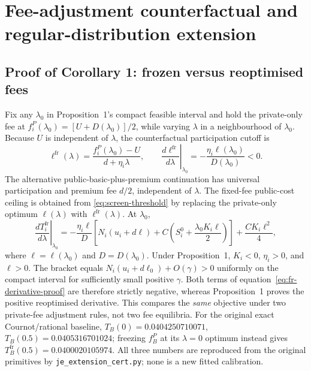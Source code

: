 \clearpage
\section{Fee-adjustment counterfactual and regular-distribution extension}
\label{app:extension}

\subsection{Proof of Corollary 1: frozen versus reoptimised fees}
Fix any $\lambda_0$ in Proposition~1's compact feasible interval and
hold the private-only fee at
$f_i^P(\lambda_0)=[U+D(\lambda_0)]/2$, while varying
$\lambda$ in a neighbourhood of $\lambda_0$. Because $U$ is independent
of $\lambda$, the counterfactual participation cutoff is
\[
 \ell^{\mathrm{fr}}(\lambda)
 =\frac{f_i^P(\lambda_0)-U}{d+\eta_i\lambda},\qquad
 \left.\frac{d\ell^{\mathrm{fr}}}{d\lambda}\right|_{\lambda_0}
 =-\frac{\eta_i\ell(\lambda_0)}{D(\lambda_0)}<0.
\]
The alternative public-basic-plus-premium continuation has universal
participation and premium fee $d/2$, independent of $\lambda$.
The fixed-fee public-cost ceiling is obtained from
\eqref{eq:screen-threshold} by replacing the private-only optimum
$\ell(\lambda)$ with $\ell^{\mathrm{fr}}(\lambda)$. At $\lambda_0$,
\begin{equation}
 \left.\frac{dT_i^{\mathrm{fr}}}{d\lambda}\right|_{\lambda_0}
 =-\frac{\eta_i\ell}{D}
  \left[N_i(u_i+d\ell)+C\left(S_i^0+
              \frac{\lambda_0K_i\ell}{2}\right)\right]
    +\frac{CK_i\ell^2}{4},
 \label{eq:fr-derivative-proof}
\end{equation}
where $\ell=\ell(\lambda_0)$ and $D=D(\lambda_0)$.
Under Proposition~1, $K_i<0$, $\eta_i>0$, and $\ell>0$.
The bracket equals $N_i(u_i+d\ell_0)+O(\gamma)>0$ uniformly
on the compact interval for sufficiently small positive $\gamma$.
Both terms of equation~\eqref{eq:fr-derivative-proof} are therefore
strictly negative, whereas Proposition~1 proves the positive
reoptimised derivative. This compares the \emph{same} objective under
two private-fee adjustment rules, not two fee equilibria.
For the original exact Cournot/rational baseline,
$T_B(0)=0.0404250710071$, $T_B(0.5)=0.0405316701024$;
freezing $f_B^P$ at its $\lambda=0$ optimum instead gives
$T_B^{\mathrm{fr}}(0.5)=0.0400020105974$.
All three numbers are reproduced from the original primitives by
\texttt{je\_extension\_cert.py}; none is a new fitted calibration.

